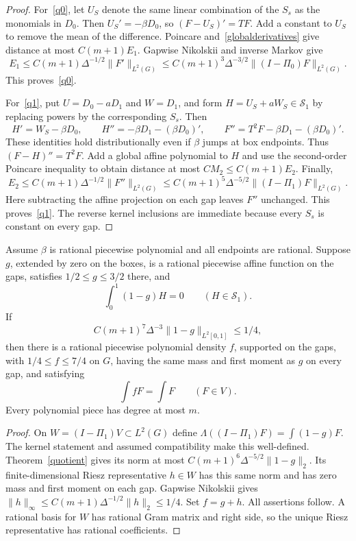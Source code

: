 \documentclass[11pt]{article}
\begin{document}
\begin{proof}
For~\eqref{q0}, let $U_S$ denote the same linear combination of the
$S_s$ as the monomials in $D_0$. Then $U_S'=-\beta D_0$, so
$(F-U_S)'=TF$. Add a constant to $U_S$ to remove the mean of the
difference. Poincare and~\eqref{globalderivatives} give distance at
most $C(m+1)E_1$. Gapwise Nikolskii and inverse Markov give
\[
 E_1\le C(m+1)\Delta^{-1/2}\|F'\|_{L^2(G)}
 \le C(m+1)^3\Delta^{-3/2}\|(I-\Pi_0)F\|_{L^2(G)}.
\]
This proves~\eqref{q0}.

For~\eqref{q1}, put $U=D_0-aD_1$ and $W=D_1$, and form
$H=U_S+aW_S\in\mathcal S_1$ by replacing powers by the corresponding
$S_s$. Then
\[
 H'=W_S-\beta D_0,\qquad
 H''=-\beta D_1-(\beta D_0)',\qquad
 F''=T^2F-\beta D_1-(\beta D_0)'.
\]
These identities hold distributionally even if $\beta$ jumps at box
endpoints. Thus $(F-H)''=T^2F$. Add a global affine polynomial to $H$
and use the second-order Poincare inequality to obtain distance at
most $CM_2\le C(m+1)E_2$. Finally,
\[
 E_2\le C(m+1)\Delta^{-1/2}\|F''\|_{L^2(G)}
 \le C(m+1)^5\Delta^{-5/2}\|(I-\Pi_1)F\|_{L^2(G)}.
\]
Here subtracting the affine projection on each gap leaves $F''$
unchanged. This proves~\eqref{q1}. The reverse kernel inclusions are
immediate because every $S_s$ is constant on every gap.
\end{proof}

\begin{corollary}\label{completion}
Assume $\beta$ is rational piecewise polynomial and all endpoints are rational.
Suppose $g$, extended by zero on the boxes, is a rational piecewise
affine function on the gaps, satisfies $1/2\le g\le3/2$ there, and
\[
 \int_0^1 (1-g)H=0\qquad(H\in\mathcal S_1).
\]
If
\[
 C(m+1)^7\Delta^{-3}\|1-g\|_{L^2[0,1]}\le1/4,
\]
then there is a rational piecewise polynomial density $f$, supported
on the gaps, with $1/4\le f\le7/4$ on $G$, having the same mass and first
moment as $g$ on every gap, and satisfying
\[
 \int fF=\int F\qquad(F\in V).
\]
Every polynomial piece has degree at most $m$.
\end{corollary}
\begin{proof}
On $W=(I-\Pi_1)V\subset L^2(G)$ define
$\Lambda((I-\Pi_1)F)=\int(1-g)F$.
The kernel statement and assumed compatibility make this well-defined.
Theorem~\ref{quotient} gives its norm at most
$C(m+1)^6\Delta^{-5/2}\|1-g\|_2$.
Its finite-dimensional Riesz representative $h\in W$ has this same
norm and has zero mass and first moment on each gap. Gapwise
Nikolskii gives
$\|h\|_\infty\le C(m+1)\Delta^{-1/2}\|h\|_2\le1/4$.
Set $f=g+h$. All assertions follow. A rational basis for $W$ has
rational Gram matrix and right side, so the unique Riesz representative
has rational coefficients.
\end{proof}
\end{document}
